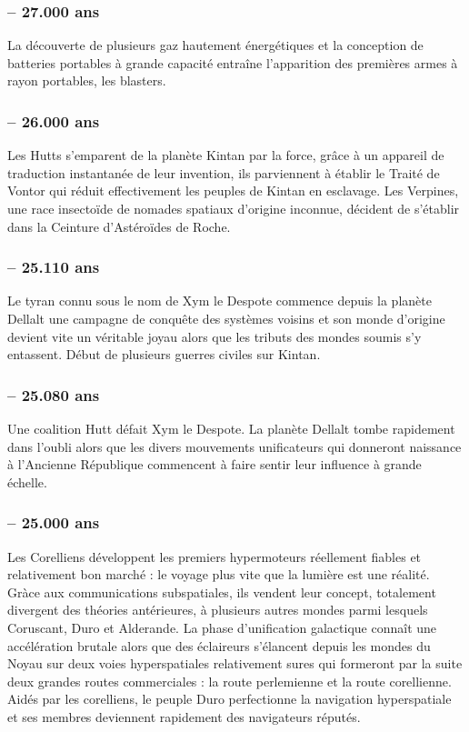 \documentclass[twoside]{article}
\begin{document}
\subsubsection*{-- 27.000 ans}
La découverte de plusieurs gaz hautement énergétiques et la conception de batteries portables à grande capacité entra\^{i}ne l'apparition des premières armes à rayon portables, les blasters. 
\subsubsection*{-- 26.000 ans} 
Les Hutts s'emparent de la planète Kintan par la force, grâce à un appareil de traduction instantanée de leur invention, ils parviennent à établir le Traité de Vontor qui réduit effectivement les peuples de Kintan en esclavage. Les Verpines, une race insectoïde de nomades spatiaux d'origine inconnue, décident de s'établir dans la Ceinture d'Astéroïdes de Roche. 
\subsubsection*{-- 25.110 ans}
Le tyran connu sous le nom de Xym le Despote commence depuis la planète Dellalt une campagne de conquête des systèmes voisins et son monde d'origine devient vite un véritable joyau alors que les tributs des mondes soumis s'y entassent.
Début de plusieurs guerres civiles sur Kintan. 
\subsubsection*{-- 25.080 ans}
Une coalition Hutt défait Xym le Despote. La planète Dellalt tombe rapidement dans l'oubli alors que les divers mouvements unificateurs qui donneront naissance à l'Ancienne République commencent à faire sentir leur influence à grande échelle. 
\subsubsection*{-- 25.000 ans}
Les Corelliens développent les premiers hypermoteurs réellement fiables et relativement bon marché : le voyage plus vite que la lumière est une réalité. Gràce aux communications subspatiales, ils vendent leur concept, totalement divergent des théories antérieures, à plusieurs autres mondes parmi lesquels Coruscant, Duro  et Alderande. La phase d'unification galactique conna\^{i}t une accélération brutale alors que des éclaireurs s'élancent depuis les mondes du Noyau sur deux voies hyperspatiales relativement sures qui formeront par la suite deux grandes routes commerciales : la route perlemienne et la route corellienne.
Aidés par les corelliens, le peuple Duro perfectionne la navigation hyperspatiale et ses membres deviennent rapidement des navigateurs réputés.\\
\end{document}

